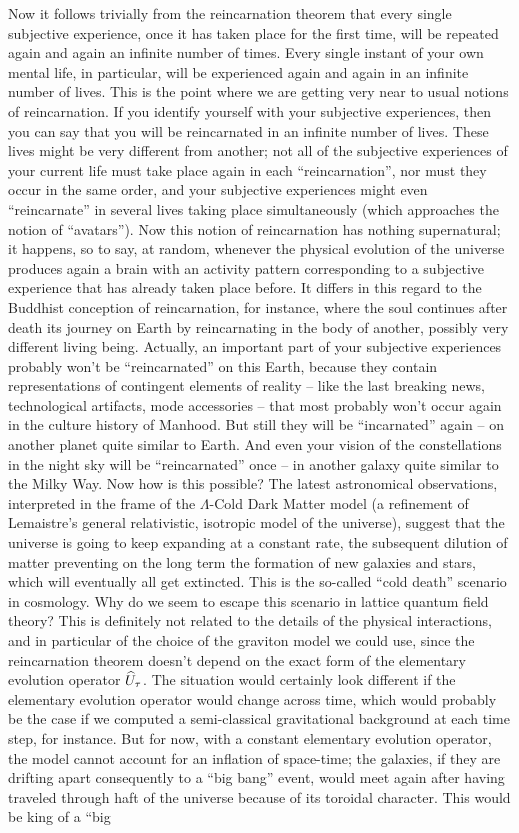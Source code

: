 Now it follows trivially from the reincarnation theorem that every single subjective experience, once it has taken place for the first time, will be repeated again and again an infinite number of times. Every single instant of your own mental life, in particular, will be experienced again and again in an infinite number of lives. This is the point where we are getting very near to usual notions of reincarnation. If you identify yourself with your subjective experiences, then you can say that you will be reincarnated in an infinite number of lives. These lives might be very different from another; not all of the subjective experiences of your current life must take place again in each ``reincarnation'', nor must they occur in the same order, and your subjective experiences might even ``reincarnate'' in several lives taking place simultaneously (which approaches the notion of ``avatars''). Now this notion of reincarnation has nothing supernatural; it happens, so to say, at random, whenever the physical evolution of the universe produces again a brain with an activity pattern corresponding to a subjective experience that has already taken place before. It differs in this regard to the Buddhist conception of reincarnation, for instance, where the soul continues after death its journey on Earth by reincarnating in the body of another, possibly very different living being. Actually, an important part of your subjective experiences probably won't be ``reincarnated'' on this Earth, because they contain representations of contingent elements of reality -- like the last breaking news, technological artifacts, mode accessories -- that most probably won't occur again in the culture history of Manhood. But still they will be ``incarnated'' again -- on another planet quite similar to Earth. And even your vision of the constellations in the night sky will be ``reincarnated'' once -- in another galaxy quite similar to the Milky Way. Now how is this possible? The latest astronomical observations, interpreted in the frame of the  $\Lambda$-Cold Dark Matter model (a refinement of Lemaistre's general relativistic, isotropic model of the universe), suggest that the universe is going to keep expanding at a constant rate, the subsequent dilution of matter preventing on the long term the formation of new galaxies and stars, which will eventually all get extincted. This is the so-called ``cold death'' scenario in cosmology. Why do we seem to escape this scenario in lattice quantum field theory? This is definitely not related to the details of the physical interactions, and in particular of the choice of the graviton model we could use, since the reincarnation theorem doesn't depend on the exact form of the elementary evolution operator $\widehat{U}_\tau$. The situation would certainly look different if the elementary evolution operator would change across time, which would probably be the case if we computed a semi-classical gravitational background at each time step, for instance. But for now, with a constant elementary evolution operator, the model cannot account for an inflation of space-time; the galaxies, if they are drifting apart consequently to a ``big bang'' event, would meet again after having traveled through haft of the universe because of its toroidal character. This would be king of a ``big 